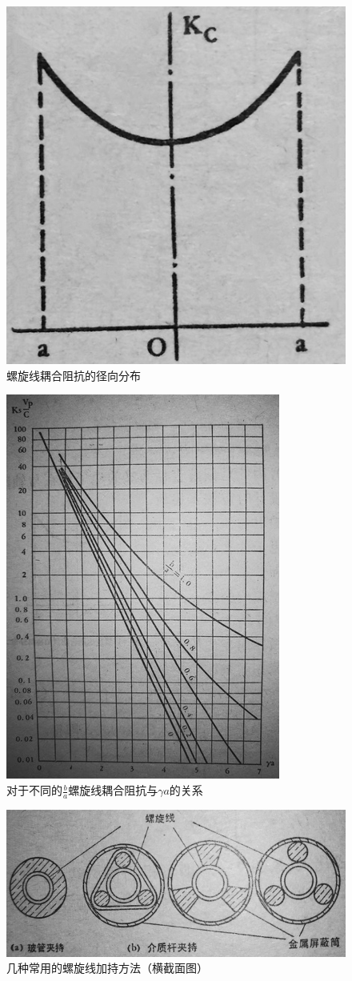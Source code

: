 \begin{figure}[phtb]
	\centering
	\includegraphics[width=0.65\linewidth]{figure/ch3-7}
	\caption{螺旋线耦合阻抗的径向分布}
	\label{ch3-7}
\end{figure}

\begin{figure}[phtb]
	\centering
	\includegraphics[width=0.65\linewidth]{figure/ch3-8}
	\caption{对于不同的$ \frac{b}{a} $螺旋线耦合阻抗与$ \gamma a $的关系}
	\label{ch3-8}
\end{figure}

\begin{figure}[phtb]
	\centering
	\includegraphics[width=0.65\linewidth]{figure/ch3-9}
	\caption{几种常用的螺旋线加持方法（横截面图）}
	\label{ch3-9}
\end{figure}

